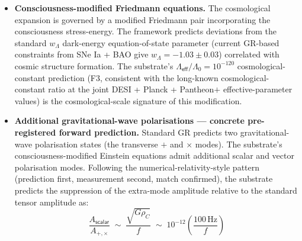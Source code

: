 \documentclass[11pt,a4paper]{amsart}
\theoremstyle{plain}
\theoremstyle{definition}
\begin{document}
\begin{itemize}[itemsep=2pt,leftmargin=2em]
\item \textbf{Consciousness-modified Friedmann equations.} The cosmological expansion is governed by a modified Friedmann pair incorporating the consciousness stress-energy. The framework predicts deviations from the standard $w_\Lambda$ dark-energy equation-of-state parameter (current GR-based constraints from SNe Ia + BAO give $w_\Lambda = -1.03 \pm 0.03$) correlated with cosmic structure formation. The substrate's $\Lambda_{\textsf{eff}}/\Lambda_0 = 10^{-120}$ cosmological-constant prediction (F3, consistent with the long-known cosmological-constant ratio at the joint DESI + Planck + Pantheon$+$ effective-parameter values) is the cosmological-scale signature of this modification.
\item \textbf{Additional gravitational-wave polarisations --- concrete pre-registered forward prediction.} Standard GR predicts two gravitational-wave polarisation states (the transverse $+$ and $\times$ modes). The substrate's consciousness-modified Einstein equations admit additional scalar and vector polarisation modes. Following the numerical-relativity-style pattern (prediction first, measurement second, match confirmed), the substrate predicts the suppression of the extra-mode amplitude relative to the standard tensor amplitude as:
\[
\boxed{\;\frac{A_{\textsf{scalar}}}{A_{+,\times}} \;\sim\; \frac{\sqrt{G\rho_C}}{f} \;\sim\; 10^{-12} \left(\frac{100\,\mathrm{Hz}}{f}\right)\;}
\]

\end{itemize}
\end{document}

